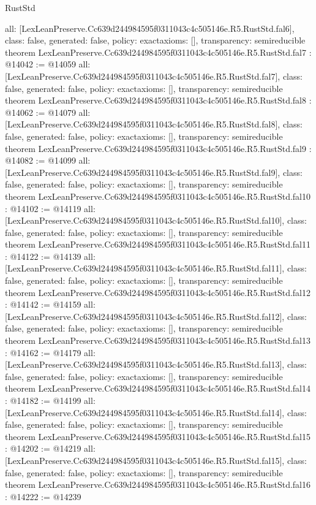 \begin{lexlean}{RustStd}
\begin{coremodule}
{  all: [LexLeanPreserve.Cc639d244984595f0311043c4c505146e.R5.RustStd.fal6],
  class: false,
  generated: false,
  policy: exact{axioms: []},
  transparency: semireducible
}
theorem LexLeanPreserve.Cc639d244984595f0311043c4c505146e.R5.RustStd.fal7 : @14042 := @14059 {
  all: [LexLeanPreserve.Cc639d244984595f0311043c4c505146e.R5.RustStd.fal7],
  class: false,
  generated: false,
  policy: exact{axioms: []},
  transparency: semireducible
}
theorem LexLeanPreserve.Cc639d244984595f0311043c4c505146e.R5.RustStd.fal8 : @14062 := @14079 {
  all: [LexLeanPreserve.Cc639d244984595f0311043c4c505146e.R5.RustStd.fal8],
  class: false,
  generated: false,
  policy: exact{axioms: []},
  transparency: semireducible
}
theorem LexLeanPreserve.Cc639d244984595f0311043c4c505146e.R5.RustStd.fal9 : @14082 := @14099 {
  all: [LexLeanPreserve.Cc639d244984595f0311043c4c505146e.R5.RustStd.fal9],
  class: false,
  generated: false,
  policy: exact{axioms: []},
  transparency: semireducible
}
theorem LexLeanPreserve.Cc639d244984595f0311043c4c505146e.R5.RustStd.fal10 : @14102 := @14119 {
  all: [LexLeanPreserve.Cc639d244984595f0311043c4c505146e.R5.RustStd.fal10],
  class: false,
  generated: false,
  policy: exact{axioms: []},
  transparency: semireducible
}
theorem LexLeanPreserve.Cc639d244984595f0311043c4c505146e.R5.RustStd.fal11 : @14122 := @14139 {
  all: [LexLeanPreserve.Cc639d244984595f0311043c4c505146e.R5.RustStd.fal11],
  class: false,
  generated: false,
  policy: exact{axioms: []},
  transparency: semireducible
}
theorem LexLeanPreserve.Cc639d244984595f0311043c4c505146e.R5.RustStd.fal12 : @14142 := @14159 {
  all: [LexLeanPreserve.Cc639d244984595f0311043c4c505146e.R5.RustStd.fal12],
  class: false,
  generated: false,
  policy: exact{axioms: []},
  transparency: semireducible
}
theorem LexLeanPreserve.Cc639d244984595f0311043c4c505146e.R5.RustStd.fal13 : @14162 := @14179 {
  all: [LexLeanPreserve.Cc639d244984595f0311043c4c505146e.R5.RustStd.fal13],
  class: false,
  generated: false,
  policy: exact{axioms: []},
  transparency: semireducible
}
theorem LexLeanPreserve.Cc639d244984595f0311043c4c505146e.R5.RustStd.fal14 : @14182 := @14199 {
  all: [LexLeanPreserve.Cc639d244984595f0311043c4c505146e.R5.RustStd.fal14],
  class: false,
  generated: false,
  policy: exact{axioms: []},
  transparency: semireducible
}
theorem LexLeanPreserve.Cc639d244984595f0311043c4c505146e.R5.RustStd.fal15 : @14202 := @14219 {
  all: [LexLeanPreserve.Cc639d244984595f0311043c4c505146e.R5.RustStd.fal15],
  class: false,
  generated: false,
  policy: exact{axioms: []},
  transparency: semireducible
}
theorem LexLeanPreserve.Cc639d244984595f0311043c4c505146e.R5.RustStd.fal16 : @14222 := @14239 {
}
\end{coremodule}
\end{lexlean}
